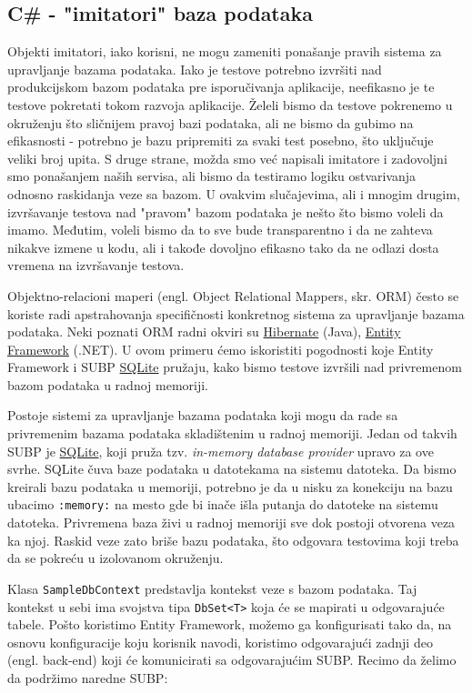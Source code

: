 \subsection{C\# - "imitatori" baza podataka}\label{c---imitatori-baza-podataka}

Objekti imitatori, iako korisni, ne mogu zameniti ponašanje pravih sistema za upravljanje bazama podataka. Iako je testove potrebno izvršiti nad produkcijskom bazom podataka pre isporučivanja aplikacije, neefikasno je te testove pokretati tokom razvoja aplikacije. Želeli bismo da testove pokrenemo u okruženju što sličnijem pravoj bazi podataka, ali ne bismo da gubimo na efikasnosti - potrebno je bazu pripremiti za svaki test posebno, što uključuje veliki broj upita. S druge strane, možda smo već napisali imitatore i zadovoljni smo ponašanjem naših servisa, ali bismo da testiramo logiku ostvarivanja odnosno raskidanja veze sa bazom. U ovakvim slučajevima, ali i mnogim drugim, izvršavanje testova nad "pravom" bazom podataka je nešto što bismo voleli da imamo. Međutim, voleli bismo da to sve bude transparentno i da ne zahteva nikakve izmene u kodu, ali i takođe dovoljno efikasno tako da ne odlazi dosta vremena na izvršavanje testova.

Objektno-relacioni maperi (engl. Object Relational Mappers, skr. ORM) često se koriste radi apstrahovanja specifičnosti konkretnog sistema za upravljanje bazama podataka. Neki poznati ORM radni okviri su \href{https://hibernate.org/}{Hibernate} (Java), \href{https://learn.microsoft.com/en-us/ef/}{Entity Framework} (.NET). U ovom primeru ćemo iskoristiti pogodnosti koje Entity Framework i SUBP \href{https://www.sqlite.org/}{SQLite} pružaju, kako bismo testove izvršili nad privremenom bazom podataka u radnoj memoriji.

Postoje sistemi za upravljanje bazama podataka koji mogu da rade sa privremenim bazama podataka skladištenim u radnoj memoriji. Jedan od takvih SUBP je \href{https://www.sqlite.org/}{SQLite}, koji pruža tzv. \emph{in-memory database provider} upravo za ove svrhe. SQLite čuva baze podataka u datotekama na sistemu datoteka. Da bismo kreirali bazu podataka u memoriji, potrebno je da u nisku za konekciju na bazu ubacimo \texttt{:memory:} na mesto gde bi inače išla putanja do datoteke na sistemu datoteka. Privremena baza živi u radnoj memoriji sve dok postoji otvorena veza ka njoj. Raskid veze zato briše bazu podataka, što odgovara testovima koji treba da se pokreću u izolovanom okruženju.

Klasa \texttt{SampleDbContext} predstavlja kontekst veze s bazom podataka. Taj kontekst u sebi ima svojstva tipa \texttt{DbSet\textless{}T\textgreater{}} koja će se mapirati u odgovarajuće tabele. Pošto koristimo Entity Framework, možemo ga konfigurisati tako da, na osnovu konfiguracije koju korisnik navodi, koristimo odgovarajući zadnji deo (engl. back-end) koji će komunicirati sa odgovarajućim SUBP. Recimo da želimo da podržimo naredne SUBP:

